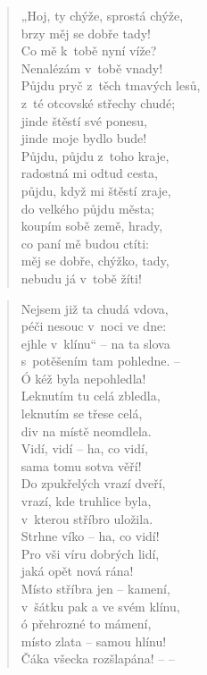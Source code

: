 \begin{verse}
„Hoj, ty chýže, sprostá chýže, \\
brzy měj se dobře tady! \\
Co mě k~tobě nyní víže? \\
Nenalézám v~tobě vnady! \\
Půjdu pryč z~těch tmavých lesů, \\
z~té otcovské střechy chudé; \\
jinde štěstí své ponesu, \\
jinde moje bydlo bude! \\
Půjdu, půjdu z~toho kraje, \\
radostná mi odtud cesta, \\
půjdu, když mi štěstí zraje, \\
do velkého půjdu města; \\
koupím sobě země, hrady, \\
co paní mě budou ctíti: \\
měj se dobře, chýžko, tady, \\
nebudu já v~tobě žíti!
\end{verse}

\begin{verse}
Nejsem již ta chudá vdova, \\
péči nesouc v~noci ve dne: \\
ejhle v~klínu“ -- na ta slova \\
s~potěšením tam pohledne. -- \\
Ó kéž byla nepohledla! \\
Leknutím tu celá zbledla, \\
leknutím se třese celá, \\
div na místě neomdlela. \\
Vidí, vidí -- ha, co vidí, \\
sama tomu sotva věří! \\
Do zpukřelých vrazí dveří, \\
vrazí, kde truhlice byla, \\
v~kterou stříbro uložila. \\
Strhne víko -- ha, co vidí! \\
Pro vši víru dobrých lidí, \\
jaká opět nová rána! \\
Místo stříbra jen -- kamení, \\
v~šátku pak a ve svém klínu, \\
ó přehrozné to mámení, \\
místo zlata -- samou hlínu! \\
Čáka všecka rozšlapána! -- --
\end{verse}

